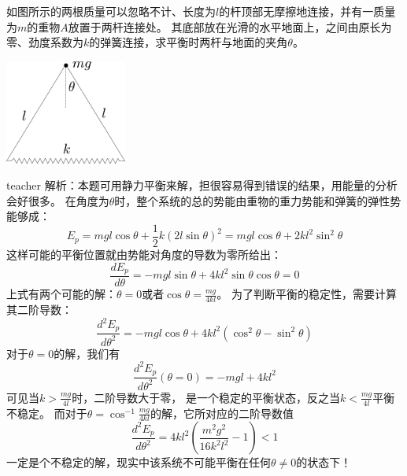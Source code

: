 \begin{example}
如图所示的两根质量可以忽略不计、长度为$l$的杆顶部无摩擦地连接，并有一质量为$m$的重物$A$放置于两杆连接处。
其底部放在光滑的水平地面上，之间由原长为零、劲度系数为$k$的弹簧连接，求平衡时两杆与地面的夹角$\theta$。
\begin{flushright}
\includegraphics[width=0.3\textwidth]{images/cal-10.pdf} 
\end{flushright}
\begin{taggedblock}{teacher}
\noindent
解析：本题可用静力平衡来解，担很容易得到错误的结果，用能量的分析会好很多。
在角度为$\theta$时，整个系统的总的势能由重物的重力势能和弹簧的弹性势能够成：
\[E_p = mgl\cos\theta +\frac{1}{2}k(2l\sin\theta)^2 = mgl\cos\theta +2kl^2\sin^2\theta \]
这样可能的平衡位置就由势能对角度的导数为零所给出：
\[\frac{dE_p}{d\theta} = -mgl\sin\theta + 4kl^2\sin\theta\cos\theta = 0 \]
上式有两个可能的解：$\theta = 0$或者$\cos\theta = \frac{mg}{4kl}$。
为了判断平衡的稳定性，需要计算其二阶导数：
\[
\frac{d^2E_p}{d\theta^2} = -mgl\cos\theta + 4kl^2(\cos^2\theta-\sin^2\theta)
\]
对于$\theta=0$的解，我们有
\[
\frac{d^2E_p}{d\theta^2}(\theta=0) = -mgl+4kl^2
\]
可见当$k>\frac{mg}{4l}$时，二阶导数大于零， 是一个稳定的平衡状态，反之当$k<\frac{mg}{4l}$平衡不稳定。
而对于$\theta=\cos^{-1}\frac{mg}{4kl}$的解，它所对应的二阶导数值
\[
\frac{d^2E_p}{d\theta^2}=4kl^2(\frac{m^2g^2}{16k^2l^2}-1)<1
\]
一定是个不稳定的解，现实中该系统不可能平衡在任何$\theta\neq 0$的状态下！
\end{taggedblock}
\end{example}






